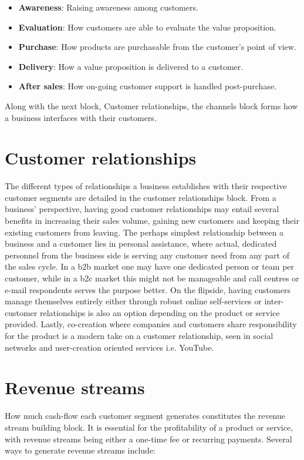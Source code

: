 \begin{itemize}
    \item \textbf{Awareness}: Raising awareness among customers.
    \item \textbf{Evaluation}: How customers are able to evaluate the value proposition.
    \item \textbf{Purchase}: How products are purchasable from the customer's point of view.
    \item \textbf{Delivery}: How a value proposition is delivered to a customer.
    \item \textbf{After sales}: How on-going customer support is handled post-purchase.
\end{itemize}
Along with the next block, Customer relationships, the channels block forms how a business interfaces with their customers. 

\section{Customer relationships}
The different types of relationships a business establishes with their respective customer segments are detailed in the customer relationships block. From a business' perspective, having good customer relationships may entail several benefits in increasing their sales volume, gaining new customers and keeping their existing customers from leaving. The perhaps simplest relationship between a business and a customer lies in personal assistance, where actual, dedicated personnel from the business side is serving any customer need from any part of the sales cycle. In a \gls{b2b} market one may have one dedicated person or team per customer, while in a \gls{b2c} market this might not be manageable and call centres or e-mail respondents serves the purpose better. On the flipside, having customers manage themselves entirely either through robust online self-services or inter-customer relationships is also an option depending on the product or service provided. Lastly, co-creation where companies and customers share responsibility for the product is a modern take on a customer relationship, seen in social networks and user-creation oriented services i.e. YouTube.

\section{Revenue streams}
How much cash-flow each customer segment generates constitutes the revenue stream building block. It is essential for the profitability of a product or service, with revenue streams being either a one-time fee or recurring payments. Several ways to generate revenue streams include:

